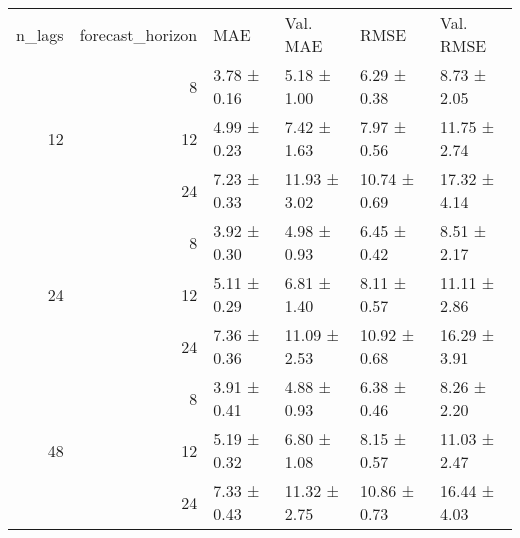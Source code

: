 \begin{tabular}{rrllll}
\toprule
n_lags & forecast_horizon & MAE & Val. MAE & RMSE & Val. RMSE \\
\multirow{3}{*}{12} & 8 & 3.78 ± 0.16 & 5.18 ± 1.00 & 6.29 ± 0.38 & 8.73 ± 2.05 \\
 & 12 & 4.99 ± 0.23 & 7.42 ± 1.63 & 7.97 ± 0.56 & 11.75 ± 2.74 \\
 & 24 & 7.23 ± 0.33 & 11.93 ± 3.02 & 10.74 ± 0.69 & 17.32 ± 4.14 \\
\midrule
\multirow{3}{*}{24} & 8 & 3.92 ± 0.30 & 4.98 ± 0.93 & 6.45 ± 0.42 & 8.51 ± 2.17 \\
 & 12 & 5.11 ± 0.29 & 6.81 ± 1.40 & 8.11 ± 0.57 & 11.11 ± 2.86 \\
 & 24 & 7.36 ± 0.36 & 11.09 ± 2.53 & 10.92 ± 0.68 & 16.29 ± 3.91 \\
\midrule
\multirow{3}{*}{48} & 8 & 3.91 ± 0.41 & 4.88 ± 0.93 & 6.38 ± 0.46 & 8.26 ± 2.20 \\
 & 12 & 5.19 ± 0.32 & 6.80 ± 1.08 & 8.15 ± 0.57 & 11.03 ± 2.47 \\
 & 24 & 7.33 ± 0.43 & 11.32 ± 2.75 & 10.86 ± 0.73 & 16.44 ± 4.03 \\
\bottomrule
\end{tabular}
